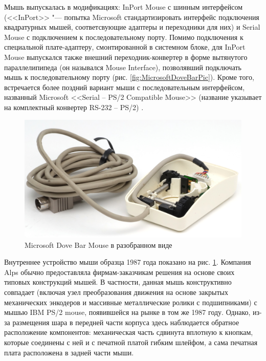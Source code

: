 \documentclass[11pt, a4paper]{article}
\begin{document}
Мышь выпускалась в модификациях: InPort Mouse с шинным интерфейсом (<<InPort>> "--- попытка Microsoft стандартизировать интерфейс подключения квадратурных мышей, соответсвующие адаптеры и переходники для них) и Serial Mouse с подключением к последовательному порту. Помимо подключения к специальной плате-адаптеру, смонтированной в системном блоке, для InPort Mouse выпускался также внешний переходник-конвертер в форме вытянутого параллелипипеда (он назывался Mouse Interface), позволявший подключать мышь к последовательному порту (рис. \ref{fig:MicrosoftDoveBarPic}). Кроме того, встречается более поздний вариант мыши с последовательным интерфейсом, названный Microsoft <<Serial -- PS/2 Compatible Mouse>> (название указывает на комплектный  конвертер RS-232 -- PS/2) \cite{doveBarDesign2}.


\begin{figure}[h]
    \centering
    \includegraphics[scale=0.6]{1987_microsoft_dove_bar_mouse/inside1_30.jpg}
    \caption{Microsoft Dove Bar Mouse в разобранном виде}
    \label{fig:MicrosoftDoveBarInside}
\end{figure}

Внутреннее устройство мыши образца 1987 года показано на рис. \ref{fig:MicrosoftDoveBarInside}. Компания Alps обычно предоставляла фирмам-заказчикам решения на основе своих типовых конструкций мышей. В частности, данная мышь конструктивно совпадает (включая узел преобразования движения на основе закрытых механических энкодеров и  массивные металлические ролики с подшипниками) с мышью IBM PS/2 mouse, появившейся на рынке в том же 1987 году. Однако, из-за размещения шара в передней части корпуса здесь наблюдается обратное расположение компонентов: механическая часть сдвинута вплотную к кнопкам, которые соединены с ней и с печатной платой гибким шлейфом, а сама печатная плата расположена в задней части мыши.
\end{document}
